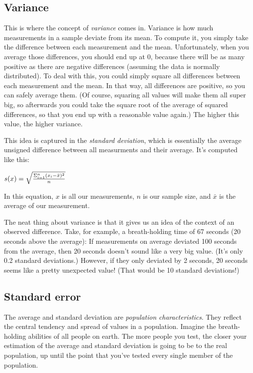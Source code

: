 \documentclass[11pt]{article}
\begin{document}
    \subsection{Variance}\label{variance}

This is where the concept of \emph{variance} comes in. Variance is how
much measurements in a sample deviate from its mean. To compute it, you
simply take the difference between each measurement and the mean.
Unfortunately, when you average those differences, you should end up at
0, because there will be as many positive as there are negative
differences (assuming the data is normally distributed). To deal with
this, you could simply square all differences between each measurement
and the mean. In that way, all differences are positive, so you can
safely average them. (Of course, squaring all values will make them all
super big, so afterwards you could take the square root of the average
of squared differences, so that you end up with a reasonable value
again.) The higher this value, the higher variance.

This idea is captured in the \emph{standard deviation}, which is
essentially the average unsigned difference between all measurments and
their average. It's computed like this:

\(s(x) = \sqrt{{{ \Sigma^{n}_{i=1} (x_{i} - \bar{x})^{2} } \over {n}}}\)

In this equation, \(x\) is all our measurements, \(n\) is our sample
size, and \(\bar{x}\) is the average of our measurement.

The neat thing about variance is that it gives us an idea of the context
of an observed difference. Take, for example, a breath-holding time of
67 seconds (20 seconds above the average): If measurements on average
deviated 100 seconds from the average, then 20 seconds doesn't sound
like a very big value. (It's only 0.2 standard deviations.) However, if
they only deviated by 2 seconds, 20 seconds seems like a pretty
unexpected value! (That would be 10 standard deviations!)

    \subsection{Standard error}\label{standard-error}

The average and standard deviation are \emph{population
characteristics}. They reflect the central tendency and spread of values
in a population. Imagine the breath-holding abilities of all people on
earth. The more people you test, the closer your estimation of the
average and standard deviation is going to be to the real population, up
until the point that you've tested every single member of the
population.
\end{document}
